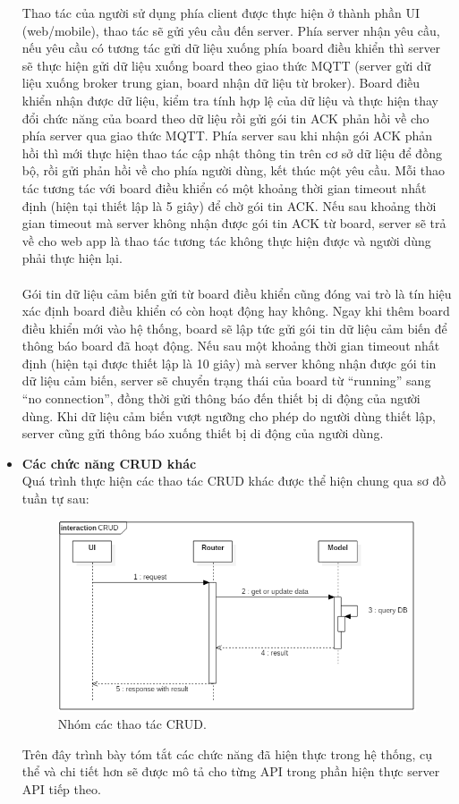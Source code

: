 \documentclass[a4paper,12pt,oneside]{article}
\begin{document}
\begin{itemize}
	Thao tác của người sử dụng phía client được thực hiện ở thành phần UI (web/mobile), thao tác sẽ gửi yêu cầu đến server. Phía server nhận yêu cầu, nếu yêu cầu có tương tác gửi dữ liệu xuống phía board điều khiển thì server sẽ thực hiện gửi dữ liệu xuống board theo giao thức MQTT (server gửi dữ liệu xuống broker trung gian, board nhận dữ liệu từ broker). Board điều khiển nhận được dữ liệu, kiểm tra tính hợp lệ của dữ liệu và thực hiện thay đổi chức năng của board theo dữ liệu rồi gửi gói tin ACK phản hồi về cho phía server qua giao thức MQTT. Phía server sau khi nhận gói ACK phản hồi thì mới thực hiện thao tác cập nhật thông tin trên cơ sở dữ liệu để đồng bộ, rồi gửi phản hồi về cho phía người dùng, kết thúc một yêu cầu. Mỗi thao tác tương tác với board điều khiển có một khoảng thời gian timeout nhất định (hiện tại thiết lập là 5 giây) để chờ gói tin ACK. Nếu sau khoảng thời gian timeout mà server không nhận được gói tin ACK từ board, server sẽ trả về cho web app là thao tác tương tác không thực hiện được và người dùng phải thực hiện lại.\\
	\\
	\noindent Gói tin dữ liệu cảm biến gửi từ board điều khiển cũng đóng vai trò là tín hiệu xác định board điều khiển có còn hoạt động hay không. Ngay khi thêm board điều khiển mới vào hệ thống, board sẽ lập tức gửi gói tin dữ liệu cảm biến để thông báo board đã hoạt động. Nếu sau một khoảng thời gian timeout nhất định (hiện tại được thiết lập là 10 giây) mà server không nhận được gói tin dữ liệu cảm biến, server sẽ chuyển trạng thái của board từ “running” sang  “no connection”, đồng thời gửi thông báo đến thiết bị di động của người dùng. Khi dữ liệu cảm biến vượt ngưỡng cho phép do người dùng thiết lập, server cũng gửi thông báo xuống thiết bị di động của người dùng.
	
	\item \textbf{Các chức năng CRUD khác}\\
	Quá trình thực hiện các thao tác CRUD khác được thể hiện chung qua sơ đồ tuần tự sau:
	
	\begin{figure}[H]
		\centering
		\includegraphics[scale=.65]{hinh/seq-CRUD.png}
		\caption{Nhóm các thao tác CRUD.}
	\end{figure}
	
	Trên đây trình bày tóm tắt các chức năng đã hiện thực trong hệ thống, cụ thể và chi tiết hơn sẽ được mô tả cho từng API trong phần hiện thực server API tiếp theo.
\end{itemize}
\end{document}
